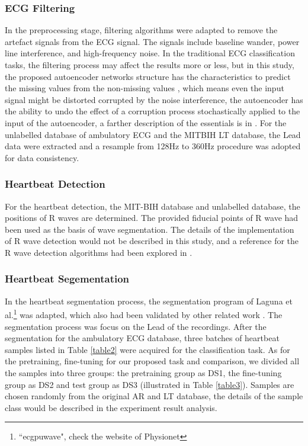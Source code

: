 \documentclass[journal]{IEEEtran}
\begin{document}
\subsubsection{ECG Filtering}
In the preprocessing stage, filtering algorithms were adapted to remove the artefact signals from the ECG signal. The signals include baseline wander, power line interference, and high-frequency noise. In the traditional ECG classification tasks, the filtering process may affect the results more or less, but in this study, the proposed autoencoder networks structure has the characteristics to predict the missing values from the non-missing values \cite{bengio2009}, which means even the input signal might be distorted corrupted by the noise interference, the autoencoder has the ability to undo the effect of a corruption process stochastically applied to the input of the autoencoder, a farther description of the essentials is in \cite{vincent}. For the unlabelled database of ambulatory ECG and the MITBIH LT database, the Lead \uppercase\expandafter{} data were extracted and a resample from 128Hz to 360Hz procedure was adopted for data consistency.

\subsubsection{Heartbeat Detection}
For the heartbeat detection, the MIT-BIH database and unlabelled database, the positions of R waves are determined. The provided fiducial points of R wave had been used as the basis of wave segmentation. The details of the implementation of R wave detection would not be described in this study, and a reference for the R wave detection algorithms had been explored in \cite{afonso}.

\subsubsection{Heartbeat Segementation}
In the heartbeat segmentation process, the segmentation program of Laguna et al.\footnote{``ecgpuwave", check the website of Physionet} was adapted, which also had been validated by other related work \cite{chaza}. The segmentation process was focus on the  Lead \uppercase\expandafter{} of the recordings. After the segmentation for the ambulatory ECG database, three batches of heartbeat samples listed in Table \ref{table2} were acquired for the classification task. As for the pretraining, fine-tuning for our proposed task and comparison, we divided all the samples into three groups: the pretraining group as DS1, the fine-tuning group as DS2 and test group as DS3 (illustrated in Table \ref{table3}). Samples are chosen randomly from the original AR and LT database, the details of the sample class would be described in the experiment result analysis.
\end{document}

